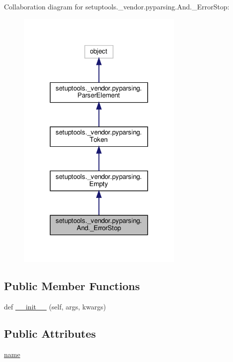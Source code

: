 Collaboration diagram for setuptools.\+\_\+vendor.\+pyparsing.\+And.\+\_\+\+Error\+Stop\+:
\nopagebreak
\begin{figure}[H]
\begin{center}
\leavevmode
\includegraphics[width=227pt]{classsetuptools_1_1__vendor_1_1pyparsing_1_1And_1_1__ErrorStop__coll__graph}
\end{center}
\end{figure}
\subsection*{Public Member Functions}
\begin{DoxyCompactItemize}
\item 
def \hyperlink{classsetuptools_1_1__vendor_1_1pyparsing_1_1And_1_1__ErrorStop_a4fba4b1a6ac5afe7ebdd7b92f3bac3e1}{\+\_\+\+\_\+init\+\_\+\+\_\+} (self, args, kwargs)
\end{DoxyCompactItemize}
\subsection*{Public Attributes}
\begin{DoxyCompactItemize}
\item 
\hyperlink{classsetuptools_1_1__vendor_1_1pyparsing_1_1And_1_1__ErrorStop_a98e0d52fb28a2b8ba0fec67b2148a2ef}{name}
\end{DoxyCompactItemize}

